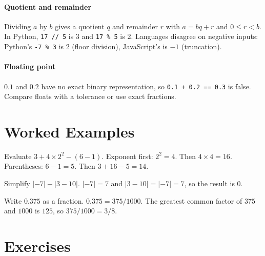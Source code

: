 \paragraph{Quotient and remainder} Dividing $a$ by $b$ gives a quotient $q$ and remainder $r$ with $a = bq + r$ and $0 \le r < b$. In Python, \lstinline!17 // 5! is 3 and \lstinline!17 % 5! is 2. Languages disagree on negative inputs: Python's \lstinline!-7 % 3! is 2 (floor division), JavaScript's is $-1$ (truncation).

\paragraph{Floating point} $0.1$ and $0.2$ have no exact binary representation, so \lstinline!0.1 + 0.2 == 0.3! is false. Compare floats with a tolerance or use exact fractions.

\section{Worked Examples}

\begin{example}
Evaluate $3 + 4 \times 2^2 - (6 - 1)$.
\solution Exponent first: $2^2 = 4$. Then $4 \times 4 = 16$. Parentheses: $6 - 1 = 5$. Then $3 + 16 - 5 = 14$.
\end{example}

\begin{example}
Simplify $|{-7}| - |3 - 10|$.
\solution $|{-7}| = 7$ and $|3 - 10| = |{-7}| = 7$, so the result is $0$.
\end{example}

\begin{example}
Write $0.375$ as a fraction.
\solution $0.375 = 375/1000$. The greatest common factor of $375$ and $1000$ is $125$, so $375/1000 = 3/8$.
\end{example}

\section{Exercises}

